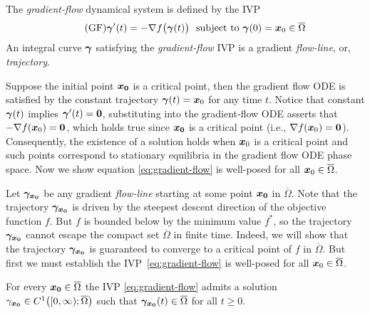 \documentclass[10pt]{article}
\begin{document}
        \begin{definition}
            \label{def:grad-flow}
            The \emph{gradient‐flow} dynamical system is defined by the IVP 
            \begin{equation}
                \label{eq:gradient-flow}\tag{GF}
                \bm{\gamma}'(t) = -\nabla f\bigl(\bm{\gamma}(t)\bigr) ~\text{ subject to } \bm{\gamma}(0) = \bm{x}_0 \in \overline\Omega
            \end{equation}
            An integral curve $\bm{\gamma}$ satisfying the \emph{gradient-flow} IVP is a gradient \emph{flow-line}, or, \emph{trajectory}.
        \end{definition}

        Suppose the initial point $\bm{x_0}$ is a critical point, then the gradient flow ODE 
        is satisfied by the constant trajectory $\bm{\gamma}(t) = \bm{x}_0$ for any time $t$. 
        Notice that constant $\bm{\gamma}(t)$ implies $\bm{\gamma}'(t) = \bm{0}$, substituting
        into the gradient-flow ODE asserts that $-\nabla f(\bm{x}_0) = \bm{0}$, which holds true
        since $\bm{x_0}$ is a critical point (i.e., $\nabla f(\bm{x}_0) = \bm{0}$).
        Consequently, the existence of a solution holds when $\bm{x}_0$ is a critical point
        and such points correspond to stationary equilibria in the gradient flow ODE phase space.
        Now we show equation \eqref{eq:gradient-flow} is well-posed for all $\bm{x}_0 \in \overline{\Omega}$.

        Let $\bm{\gamma}_{\bm{x_0}}$ be any gradient \emph{flow-line} starting at
        some point $\bm{x_0}$ in $\overline{\Omega}$. Note that the trajectory $\bm{\gamma}_{\bm{x_0}}$ 
        is driven by the steepest descent direction of the objective function $f$. But $f$ is bounded
        below by the minimum value $f^*$, so the trajectory $\bm{\gamma}_{\bm{x_0}}$ cannot
        escape the compact set $\overline{\Omega}$ in finite time. Indeed, we will show that the trajectory 
        $\bm{\gamma}_{\bm{x_0}}$ is guaranteed to converge to a critical point of $f$ in $\overline{\Omega}$.
        But first we must establish the IVP~\eqref{eq:gradient-flow} is well-posed for all $\bm{x}_0 \in \overline{\Omega}$.

        \begin{theorem}[Existence]\label{thm:gf-existence}
            For every $\bm{x_0}\in \overline{\Omega}$ the IVP \eqref{eq:gradient-flow} admits a solution
            $\gamma_{\bm{x_0}}\in C^{1}\bigl([0,\infty);\overline{\Omega}\bigr)$
            such that $\bm{\gamma}_{\bm{x_0}}(t) \in \overline{\Omega}$ for all $t\ge 0$. 
        \end{theorem}
\end{document}
